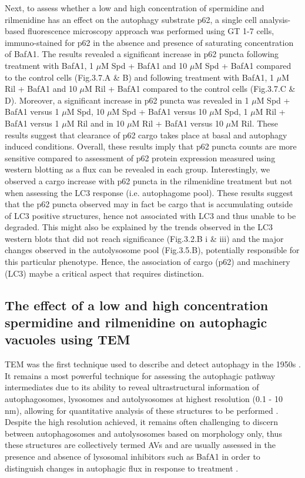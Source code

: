 {Next, to assess whether a low and high concentration of spermidine and rilmenidine has an effect on the autophagy substrate p62, a single cell analysis-based fluorescence microscopy approach was performed using GT 1-7 cells, immuno-stained for p62 in the absence and presence of saturating concentration of BafA1. The results revealed a significant increase in p62 puncta following treatment with BafA1, 1 $\mu$M Spd + BafA1 and 10 $\mu$M Spd + BafA1 compared to the control cells (Fig.3.7.A \& B) and following treatment  with BafA1, 1 $\mu$M Ril + BafA1  and 10 $\mu$M Ril + BafA1 compared to the control cells (Fig.3.7.C \& D). Moreover, a significant increase in p62 puncta was revealed in 1 $\mu$M Spd + BafA1 versus 1 $\mu$M Spd, 10 $\mu$M Spd + BafA1 versus 10 $\mu$M Spd, 1 $\mu$M Ril + BafA1 versus 1 $\mu$M Ril and in 10 $\mu$M Ril + BafA1 versus 10 $\mu$M Ril. These results suggest that clearance of p62 cargo takes place at basal and autophagy induced conditions. Overall, these results imply that p62 puncta counts are more sensitive compared to assessment of p62 protein expression measured using western blotting as a flux can be revealed in each group. Interestingly, we observed a cargo increase with p62 puncta in the rilmenidine treatment but not when assessing the LC3 response (i.e. autophagome pool). These results suggest that the p62 puncta observed may in fact be cargo that is accumulating outside of LC3 positive structures, hence not associated with LC3 and thus unable to be degraded. This might also be explained by the trends observed in the LC3 western blots that did not reach significance (Fig.3.2.B i \& iii) and the major changes observed in the autolysosome pool (Fig.3.5.B), potentially responsible for this particular phenotype. Hence, the association of cargo (p62) and machinery (LC3) maybe a critical aspect that requires distinction.

\subsection{The effect of a low and high concentration spermidine and rilmenidine on autophagic vacuoles using TEM}

TEM was the first technique used to describe and detect autophagy in the 1950s \citep{Deter1967}. It remains a most powerful technique for assessing the autophagic pathway intermediates due to its ability to reveal ultrastructural information of autophagosomes, lysosomes and autolysosomes at highest resolution (0.1 - 10 nm), allowing for quantitative analysis of these structures to be performed \citep{klionsky2016}. Despite the high resolution achieved, it remains often challenging to discern between autophagosomes and autolysosomes based on morphology only, thus these structures are collectively termed AVs \citep{Eskelinen2008,klionsky2016} and are usually assessed in the presence and absence of lysosomal inhibitors such as BafA1 in order to distinguish changes in autophagic flux in response to treatment \citep{Eskelinen2011,klionsky2016}.

}
